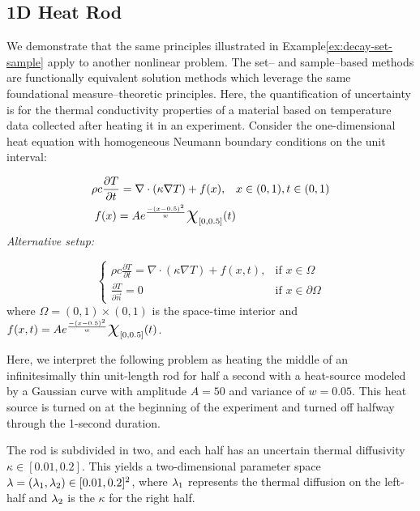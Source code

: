 \subsection{1D Heat Rod}\label{ex:heat-set-sample}

We demonstrate that the same principles illustrated in Example\ref{ex:decay-set-sample} apply to another nonlinear problem.
The set-- and sample--based methods are functionally equivalent solution methods which leverage the same foundational measure--theoretic principles.
Here, the quantification of uncertainty is for the thermal conductivity properties of a material based on temperature data collected after heating it in an experiment.
Consider the one-dimensional heat equation with homogeneous Neumann boundary conditions on the unit interval:

\begin{equation}
\begin{split}
\rho c \frac{\partial T}{\partial t} = \nabla \cdot ( \kappa \nabla T) + f(x), \quad & x\in (0,1), t\in (0,1) \\
f(x) = A e^\frac{- (x-0.5)^2}{w} \Chi_{[0,0.5]}(t)
\end{split}
\end{equation}
\emph{Alternative setup: }

\begin{equation}
\begin{cases}
\rho c \frac{\partial T}{\partial t} = \nabla \cdot ( \kappa \nabla T) + f(x,t), & \text{if } x\in \Omega \\
\frac{\partial T}{\partial \vec{n}} = 0 & \text{if } x\in \partial \Omega
\end{cases}
\end{equation}
where $\Omega = (0,1)\times (0,1)$ is the space-time interior and $f(x,t) = A e^\frac{- (x-0.5)^2}{w} \Chi_{[0,0.5]}(t)$.

Here, we interpret the following problem as heating the middle of an infinitesimally thin unit-length rod for half a second with a heat-source modeled by a Gaussian curve with amplitude $A=50$ and variance of $w=0.05$.
This heat source is turned on at the beginning of the experiment and turned off halfway through the 1-second duration.

The rod is subdivided in two, and each half has an uncertain thermal diffusivity $\kappa \in [0.01, 0.2]$.
This yields a two-dimensional parameter space $\lambda = (\lambda_1, \lambda_2) \in [0.01, 0.2]^2$, where $\lambda_1$ represents the thermal diffusion on the left-half and $\lambda_2$ is the $\kappa$ for the right half.

